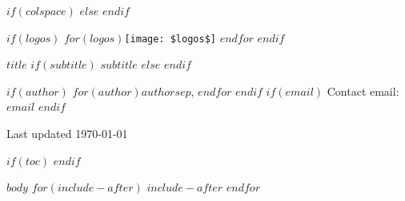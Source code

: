 \documentclass[$if(fontsize)$$fontsize$,$endif$$if(lang)$$lang$,$endif$$if(papersize)$$papersize$,$endif$$for(classoption)$$classoption$$sep$,$endfor$]{$documentclass$}
\begin{document}
\pagestyle{plain}

$if(colspace)$
\setlength{\tabcolsep}{$colspace$}
$else$
\setlength{\tabcolsep}{12pt}
$endif$

$if(logos)$
$for(logos)$\texttt{[image: \$logos\$]} \hspace*{0.2cm} $endfor$
\hfill
$endif$

\Large
{\sbf $title$}\newline
$if(subtitle)$
{\sf\normalsize $subtitle$}
$else$
$endif$

\sf\normalsize{
$if(author)$
$for(author)$$author$$sep$, $endfor$\newline
$endif$
$if(email)$
Contact email:\;$email$
$endif$}

Last updated \today
\vspace{5mm}



$if(toc)$
\setcounter{page}{1}
\setcounter{tocdepth}{2}
\tableofcontents
$endif$


$body$
$for(include-after)$
$include-after$
$endfor$
\end{document}
